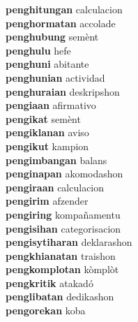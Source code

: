 \textbf{penghitungan } calculacion \\
\textbf{penghormatan } accolade \\
\textbf{penghubung } semènt \\
\textbf{penghulu } hefe \\
\textbf{penghuni } abitante \\
\textbf{penghunian } actividad \\
\textbf{penghuraian } deskripshon \\
\textbf{pengiaan } afirmativo \\
\textbf{pengikat } semènt \\
\textbf{pengiklanan } aviso \\
\textbf{pengikut } kampion \\
\textbf{pengimbangan } balans \\
\textbf{penginapan } akomodashon \\
\textbf{pengiraan } calculacion \\
\textbf{pengirim } afzender \\
\textbf{pengiring } kompañamentu \\
\textbf{pengisihan } categorisacion \\
\textbf{pengisytiharan } deklarashon \\
\textbf{pengkhianatan } traishon \\
\textbf{pengkomplotan } kòmplòt \\
\textbf{pengkritik } atakadó \\
\textbf{penglibatan } dedikashon \\
\textbf{pengorekan } koba \\
